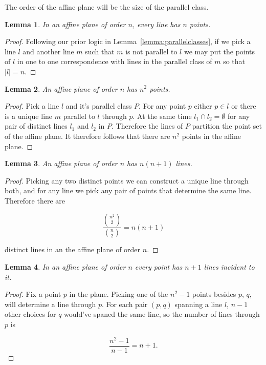 \documentclass{article}
\newtheorem{lemma}{Lemma}
\begin{document}
The order of the affine plane will be the size of the parallel class.

\begin{lemma}
  In an affine plane of order \(n\), every line has \(n\) points.
\end{lemma}
\begin{proof}
  Following our prior logic in Lemma~\ref{lemma:parallelclasses}, if we pick a line \(l\) and another line \(m\) such that \(m\) is not parallel to \(l\) we may put the points of \(l\) in one to one correspondence with lines in the parallel class of \(m\) so that \(|l| = n\).
\end{proof}

\begin{lemma}
  An affine plane of order \(n\) has \(n^{2}\) points.
\end{lemma}
\begin{proof}
  Pick a line \(l\) and it's parallel class \(P\). For any point \(p\) either \(p \in l\) or there is a unique line \(m\) parallel to \(l\) through \(p\). At the same time \(l_{1} \cap l_{2} = \emptyset\) for any pair of distinct lines \(l_{1}\) and \(l_{2}\) in \(P\). Therefore the lines of \(P\) partition the point set of the affine plane.
  It therefore follows that there are \(n^{2}\) points in the affine plane.
\end{proof}

\begin{lemma}
  An affine plane of order \(n\) has \(n(n + 1)\) lines.
\end{lemma}

\begin{proof}
  Picking any two distinct points we can construct a unique line through both, and for any line we pick any pair of points that determine the same line. Therefore there are

  \begin{equation*}
    \frac{\binom{n^{2}}{2}}{\binom{n}{2}} = n(n + 1)
  \end{equation*}

  distinct lines in an the affine plane of order \(n\).
\end{proof}

\begin{lemma}
  In an affine plane of order \(n\) every point has \(n + 1\) lines incident to it.
\end{lemma}
\begin{proof}
  Fix a point \(p\) in the plane. Picking one of the \(n^{2} - 1\) points besides \(p\), \(q\), will determine a line through \(p\). For each pair \((p, q)\) spanning a line \(l\), \(n - 1\) other choices for \(q\) would've spaned the same line, so the number of lines through \(p\) is

  \begin{equation}
    \frac{n^{2} - 1}{n - 1} = n + 1.
  \end{equation}
\end{proof}
\end{document}
